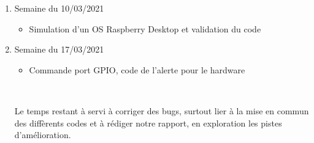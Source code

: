 \documentclass[a4paper]{report}
\begin{document}
\begin{enumerate}
\begin{itemize}
            \end{itemize}
        \item Semaine du 10/03/2021
            \begin{itemize}
                \item Simulation d'un OS Raspberry Desktop et validation du code
            \end{itemize}
        \item Semaine du 17/03/2021
            \begin{itemize}
                \item Commande port GPIO, code de l'alerte pour le hardware
            \end{itemize} \

        Le temps restant à servi à corriger des bugs, surtout lier à la mise en commun 
        des diffèrents codes et à rédiger notre rapport, en exploration les pistes d'amélioration.
    \end{enumerate}

    
    
\end{document}
